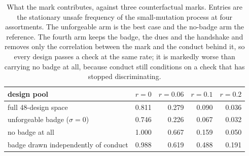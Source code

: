 \begin{table}[t]
\centering
\caption{What the mark contributes, against three counterfactual
marks.  Entries are the stationary unsafe frequency of the
small-mutation process at four assortments.  The unforgeable arm is
the best case and the no-badge arm the reference.  The fourth arm
keeps the badge, the dues and the handshake and removes only the
correlation between the mark and the conduct behind it, so every
design passes a check at the same rate; it is markedly worse than
carrying no badge at all, because conduct still conditions on a
check that has stopped discriminating.}
\label{tab:ablation}
\small
\begin{tabular}{lrrrr}
\toprule
design pool & $r=0$ & $r=0.06$ & $r=0.1$ & $r=0.2$ \\
\midrule
full 48-design space & 0.811 & 0.279 & 0.090 & 0.036 \\
unforgeable badge ($\sigma = 0$) & 0.746 & 0.226 & 0.067 & 0.032 \\
no badge at all & 1.000 & 0.667 & 0.159 & 0.050 \\
badge drawn independently of conduct & 0.988 & 0.619 & 0.488 & 0.191 \\
\bottomrule
\end{tabular}
\end{table}
